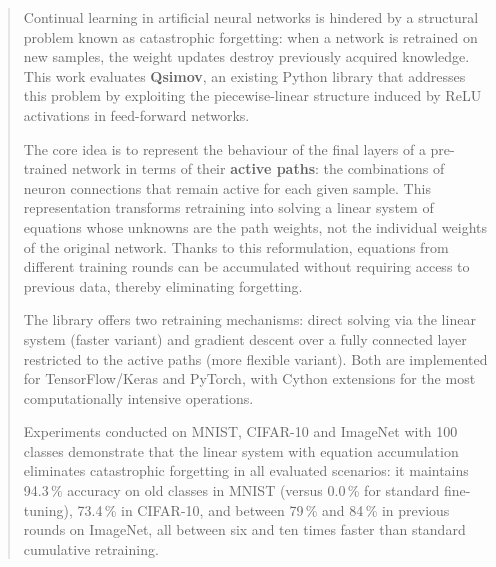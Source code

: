 \documentclass[twoside,spanish,a4paper,12pt]{tfg}
\begin{document}
\begin{abstract}
Continual learning in artificial neural networks is hindered by a structural problem known as
catastrophic forgetting: when a network is retrained on new samples, the weight updates destroy
previously acquired knowledge. This work evaluates \textbf{Qsimov}, an existing Python library that
addresses this problem by exploiting the piecewise-linear structure induced by ReLU activations in
feed-forward networks.

The core idea is to represent the behaviour of the final layers of a pre-trained network in terms of
their \textbf{active paths}: the combinations of neuron connections that remain active for each given
sample. This representation transforms retraining into solving a linear system of equations whose
unknowns are the path weights, not the individual weights of the original network. Thanks to this
reformulation, equations from different training rounds can be accumulated without requiring access
to previous data, thereby eliminating forgetting.

The library offers two retraining mechanisms: direct solving via the linear system (faster variant)
and gradient descent over a fully connected layer restricted to the active paths (more flexible
variant). Both are implemented for TensorFlow/Keras and PyTorch, with Cython extensions for the most
computationally intensive operations.

Experiments conducted on MNIST, CIFAR-10 and ImageNet with 100 classes demonstrate that the linear
system with equation accumulation eliminates catastrophic forgetting in all evaluated scenarios: it
maintains 94.3\,\% accuracy on old classes in MNIST (versus 0.0\,\% for standard fine-tuning),
73.4\,\% in CIFAR-10, and between 79\,\% and 84\,\% in previous rounds on ImageNet, all between
six and ten times faster than standard cumulative retraining.

\end{abstract}
\cleardoublepage
\end{document}
